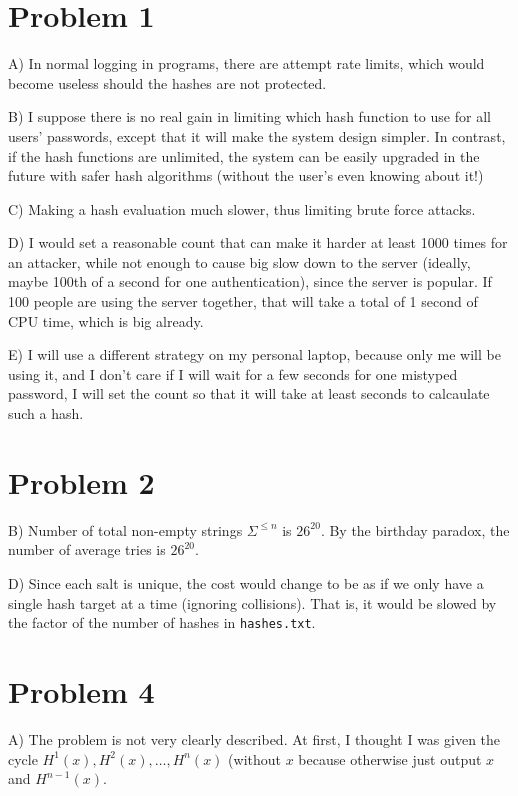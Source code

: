 \documentclass{6160}
\author{Guanyuming He}
\begin{document}
\section*{Problem 1}

A) In normal logging in programs, there are attempt rate limits, which would
become useless should the hashes are not protected.

B) I suppose there is no real gain in limiting which hash function to use for
all users' passwords, except that it will make the system design simpler.  In
contrast, if the hash functions are unlimited, the system can be easily upgraded
in the future with safer hash algorithms (without the user's even knowing about
it!)

C) Making a hash evaluation much slower, thus limiting brute force attacks.

D) I would set a reasonable count that can make it harder at least 1000 times
for an attacker, while not enough to cause big slow down to the server (ideally,
maybe 100th of a second for one authentication), since the server is popular.
If 100 people are using the server together, that will take a total of 1 second
of CPU time, which is big already.

E) I will use a different strategy on my personal laptop, because only me will
be using it, and I don't care if I will wait for a few seconds for one mistyped
password, I will set the count so that it will take at least seconds to
calcaulate such a hash.

\newpage \section*{Problem 2}

B)
Number of total non-empty strings $\Sigma^{\le n}$ is $26^{20}$. By the birthday
paradox, the number of average tries is $26^{20}$.

D)
Since each salt is unique, the cost would change to be as if we only have a
single hash target at a time (ignoring collisions). That is, it would be slowed
by the factor of the number of hashes in \verb|hashes.txt|.


\newpage \section*{Problem 4}

A)
The problem is not very clearly described. At first, I thought I was given the
cycle $H^1(x), H^2(x), \dots, H^n(x)$ (without $x$ because otherwise just output
$x$ and $H^{n-1}(x)$.
\end{document}
